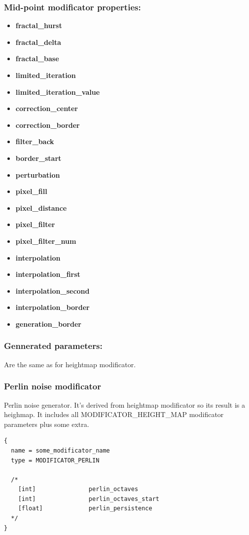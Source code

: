 \documentclass[9pt]{article}
\begin{document}
\subsubsection*{Mid-point modificator properties:}
\begin{itemize}
\item{\bf fractal\_hurst}
\item{\bf fractal\_delta}
\item{\bf fractal\_base}
\item{\bf limited\_iteration}
\item{\bf limited\_iteration\_value}
\item{\bf correction\_center}
\item{\bf correction\_border}
\item{\bf filter\_back}
\item{\bf border\_start}
\item{\bf perturbation}
\item{\bf pixel\_fill}
\item{\bf pixel\_distance}
\item{\bf pixel\_filter}
\item{\bf pixel\_filter\_num}
\item{\bf interpolation}
\item{\bf interpolation\_first}
\item{\bf interpolation\_second}
\item{\bf interpolation\_border}
\item{\bf generation\_border}
\end{itemize}

\subsubsection*{Gennerated parameters:}

Are the same as for heightmap modificator.

\subsubsection{Perlin noise modificator}

Perlin noise generator. It's derived from heightmap modificator
so its result is a heighmap. It includes all MODIFICATOR\_HEIGHT\_MAP modificator 
parameters plus some extra.

\begin{verbatim}
{
  name = some_modificator_name
  type = MODIFICATOR_PERLIN

  /*
    [int]               perlin_octaves
    [int]               perlin_octaves_start
    [float]             perlin_persistence
  */
}
\end{verbatim}
\end{document}
